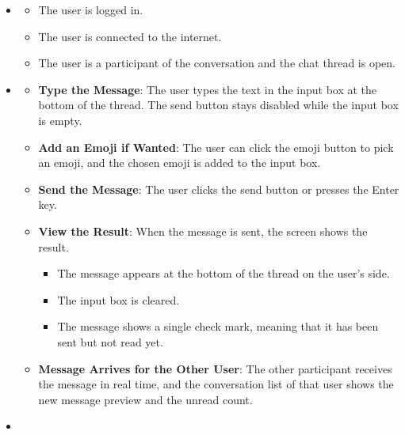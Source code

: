 
\begin{itemize}[leftmargin=1.6em,topsep=4pt,itemsep=3pt,parsep=0pt,label=$\bullet$]
    \item {}

        \begin{itemize}[leftmargin=2.2em,topsep=2pt,itemsep=3pt,parsep=0pt,label=$\circ$]
            \item The user is logged in.
            \item The user is connected to the internet.
            \item The user is a participant of the conversation and the chat thread is open.
        \end{itemize}
    \item {}

        \begin{itemize}[leftmargin=2.2em,topsep=2pt,itemsep=3pt,parsep=0pt,label=$\circ$]
            \item \textbf{Type the Message}: The user types the text in the input box at the bottom of the thread. The send button stays disabled while the input box is empty.
            \item \textbf{Add an Emoji if Wanted}: The user can click the emoji button to pick an emoji, and the chosen emoji is added to the input box.
            \item \textbf{Send the Message}: The user clicks the send button or presses the Enter key.
            \item \textbf{View the Result}: When the message is sent, the screen shows the result.
                \begin{itemize}[leftmargin=2.2em,topsep=2pt,itemsep=3pt,parsep=0pt,label=$\blacksquare$]
                    \item The message appears at the bottom of the thread on the user's side.
                    \item The input box is cleared.
                    \item The message shows a single check mark, meaning that it has been sent but not read yet.
                \end{itemize}
            \item \textbf{Message Arrives for the Other User}: The other participant receives the message in real time, and the conversation list of that user shows the new message preview and the unread count.
        \end{itemize}
    \item {}


\end{itemize}
